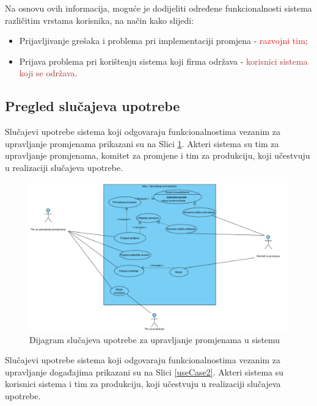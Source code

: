\documentclass[12pt,a4paper]{article}
\begin{document}
Na osnovu ovih informacija, moguće je dodijeliti određene funkcionalnosti sistema različitim vrstama korisnika, na način kako slijedi:

\begin{itemize}
\renewcommand\labelitemi{$\square$}
\item Prijavljivanje grešaka i problema pri implementaciji promjena - \textcolor{red}{razvojni tim};
\item Prijava problema pri korištenju sistema koji firma održava - \textcolor{brown}{korisnici sistema koji se održava}.
\end{itemize}

\newpage

\subsection{Pregled slučajeva upotrebe}

\quad Slučajevi upotrebe sistema koji odgovaraju funkcionalnostima vezanim za upravljanje promjenama prikazani su na Slici \ref{useCase1}. Akteri sistema su tim za upravljanje promjenama, komitet za promjene i tim za produkciju, koji učestvuju u realizaciji slučajeva upotrebe.

\begin{figure}[H]
\center
\includegraphics[scale=0.4]{../res/UseCase/useCase1.PNG}
\caption{Dijagram slučajeva upotrebe za upravljanje promjenama u sistemu}
\label{useCase1}
\end{figure}

Slučajevi upotrebe sistema koji odgovaraju funkcionalnostima vezanim za upravljanje događajima prikazani su na Slici \ref{useCase2}. Akteri sistema su korisnici sistema i tim za produkciju, koji učestvuju u realizaciji slučajeva upotrebe.
\end{document}
